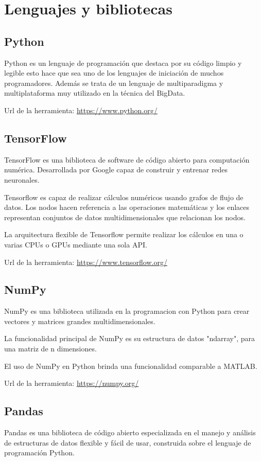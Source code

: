 \section{Lenguajes y bibliotecas}

\subsection{Python}
Python es un lenguaje de programación que destaca por su código limpio y legible esto hace que sea uno de los lenguajes de iniciación de muchos programadores.
Además se trata de un lenguaje de multiparadigma y multiplataforma muy utilizado en la técnica del BigData.

Url de la herramienta: \url{https://www.python.org/}

\subsection{TensorFlow}
TensorFlow es una biblioteca de software de código abierto para computación numérica. Desarrollada por Google capaz de construir y entrenar redes neuronales.

Tensorflow es capaz de realizar cálculos
numéricos usando grafos de flujo de datos. Los nodos hacen referencia a las operaciones matemáticas y los enlaces representan conjuntos de datos multidimensionales que relacionan los nodos.

La arquitectura flexible de Tensorflow permite realizar los cálculos en una o varias CPUs o GPUs mediante una sola API.

Url de la herramienta: \url{https://www.tensorflow.org/}

\subsection{NumPy}
NumPy es una biblioteca utilizada en la programacion con Python para crear vectores y matrices grandes multidimensionales.

La funcionalidad principal de NumPy es su estructura de datos "ndarray", para una matriz de n dimensiones.

El uso de NumPy en Python brinda una funcionalidad comparable a MATLAB.

Url de la herramienta: \url{https://numpy.org/}

\subsection{Pandas}
Pandas es una biblioteca de código abierto especializada en el manejo y análisis de estructuras de datos flexible y fácil de usar, construida sobre el lenguaje de programación Python.

